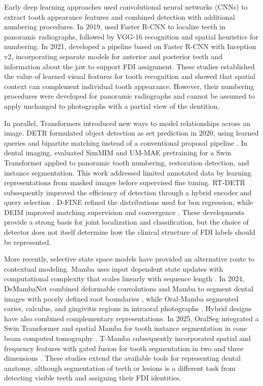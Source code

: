 \documentclass[a4paper,fleqn]{cas-dc}
\begin{document}
Early deep learning approaches used convolutional neural networks (CNNs) to extract tooth appearance features and combined detection with additional numbering procedures. In 2019, \citet{tuzoff2019tooth} used Faster R-CNN to localize teeth in panoramic radiographs, followed by VGG-16 recognition and spatial heuristics for numbering. In 2021, \citet{bilgir2021automatic} developed a pipeline based on Faster R-CNN with Inception v2, incorporating separate models for anterior and posterior teeth and information about the jaw to support FDI assignment. These studies established the value of learned visual features for tooth recognition and showed that spatial context can complement individual tooth appearance. However, their numbering procedures were developed for panoramic radiographs and cannot be assumed to apply unchanged to photographs with a partial view of the dentition.

In parallel, Transformers introduced new ways to model relationships across an image. DETR formulated object detection as set prediction in 2020, using learned queries and bipartite matching instead of a conventional proposal pipeline \citep{carion2020detr}. In dental imaging, \citet{almalki2023masked} evaluated SimMIM and UM-MAE pretraining for a Swin Transformer applied to panoramic tooth numbering, restoration detection, and instance segmentation. This work addressed limited annotated data by learning representations from masked images before supervised fine tuning. RT-DETR subsequently improved the efficiency of detection through a hybrid encoder and query selection \citep{zhao2024rtdetr}. D-FINE refined the distributions used for box regression, while DEIM improved matching supervision and convergence \citep{peng2025dfine,huang2025deim}. These developments provide a strong basis for joint localization and classification, but the choice of detector does not itself determine how the clinical structure of FDI labels should be represented.

More recently, selective state space models have provided an alternative route to contextual modeling. Mamba uses input dependent state updates with computational complexity that scales linearly with sequence length \citep{gu2024mamba}. In 2024, DeMambaNet combined deformable convolutions and Mamba to segment dental images with poorly defined root boundaries \citep{zou2024demambanet}, while Oral-Mamba segmented caries, calculus, and gingivitis regions in intraoral photographs \citep{liu2024oral}. Hybrid designs have also combined complementary representations. In 2025, OralSeg integrated a Swin Transformer and spatial Mamba for tooth instance segmentation in cone beam computed tomography \citep{zhou2025oralseg}. T-Mamba subsequently incorporated spatial and frequency features with gated fusion for tooth segmentation in two and three dimensions \citep{hao2026tmamba}. These studies extend the available tools for representing dental anatomy, although segmentation of teeth or lesions is a different task from detecting visible teeth and assigning their FDI identities.
\end{document}
